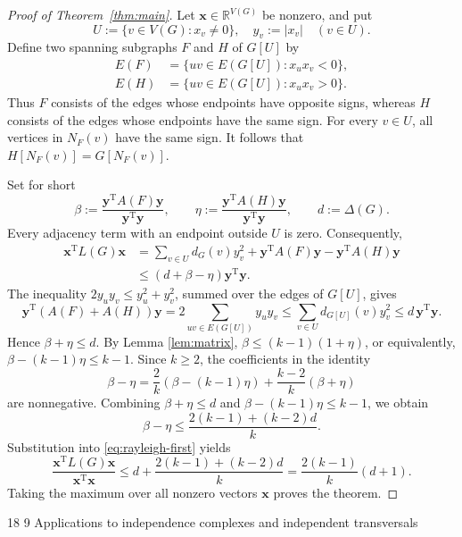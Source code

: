 \documentclass[11pt]{article}
\makeatletter
\renewcommand\section{\@startsection{section}{1}{\z@}%
{18\p@ \@plus 6\p@ \@minus 3\p@}%
{9\p@ \@plus 6\p@ \@minus 3\p@}%
{\large\bfseries\boldmath}}
\theoremstyle{plain}
\theoremstyle{definition}
\numberwithin{equation}{section}
\makeatother
\begin{document}
\begin{proof}[Proof of Theorem~\ref{thm:main}]
Let $\bm{x}\in\mathbb{R}^{V(G)}$ be nonzero, and put
\[
U:= \{v\in V(G): x_v\neq 0\}, \quad y_v:= |x_v| \quad (v\in U).
\]
Define two spanning subgraphs $F$ and $H$ of $G[U]$ by
\[
\begin{aligned}
    E(F) & =\{uv\in E(G[U]):x_ux_v<0\}, \\
    E(H) & =\{uv\in E(G[U]):x_ux_v>0\}.
\end{aligned}
\]
Thus $F$ consists of the edges whose endpoints have opposite signs, whereas
$H$ consists of the edges whose endpoints have the same sign. For every
$v\in U$, all vertices in $N_F(v)$ have the same sign. It follows that $H[N_F(v)] = G[N_F(v)]$.

Set for short
\[
\beta:= \frac{\bm{y}^{\mathrm{T}} A(F) \bm{y}}{\bm{y}^{\mathrm{T}} \bm{y}},
\qquad
\eta:= \frac{\bm{y}^{\mathrm{T}} A(H) \bm{y}}{\bm{y}^{\mathrm{T}} \bm{y}}, \qquad d:= \Delta(G).
\]
Every adjacency term with an endpoint outside $U$ is zero. Consequently,
\begin{align}
\bm{x}^{\mathrm{T}} L(G) \bm{x}
& = \sum_{v\in U} d_G(v) y_v^2 + \bm{y}^{\mathrm{T}} A(F) \bm{y} - \bm{y}^{\mathrm{T}} A(H) \bm{y} \nonumber \\
& \leq (d + \beta - \eta) \bm{y}^{\mathrm{T}} \bm{y}. \label{eq:rayleigh-first}
\end{align}
The inequality $2y_uy_v\leq y_u^2+y_v^2$, summed over the edges of $G[U]$, gives
\[
\bm{y}^{\mathrm{T}} (A(F) + A(H)) \bm{y}
= 2\sum_{uv\in E(G[U])} y_uy_v\leq \sum_{v\in U} d_{G[U]}(v) y_v^2\leq d\,\bm{y}^{\mathrm{T}} \bm{y}.
\]
Hence $\beta + \eta\leq d$. By Lemma \ref{lem:matrix},
$\beta\leq (k-1)(1 + \eta)$, or equivalently, $\beta - (k-1)\eta\leq k-1$. 
Since $k\geq 2$, the coefficients in the identity
\[
\beta - \eta = \frac{2}{k}(\beta - (k-1)\eta) + \frac{k-2}{k}(\beta + \eta)
\]
are nonnegative. Combining $\beta + \eta\leq d$ and
$\beta - (k-1)\eta\leq k-1$, we obtain
\[
\beta - \eta \leq \frac{2(k-1) + (k-2)d}{k}.
\]
Substitution into \eqref{eq:rayleigh-first} yields
\[
\frac{\bm{x}^{\mathrm{T}} L(G) \bm{x}}{\bm{x}^{\mathrm{T}} \bm{x}}
\leq d + \frac{2(k-1) + (k-2)d}{k} = \frac{2(k-1)}{k}(d+1).
\]
Taking the maximum over all nonzero vectors $\bm{x}$ proves the theorem.
\end{proof}


\section{Applications to independence complexes and independent transversals}
\label{sec:applications}
\end{document}
